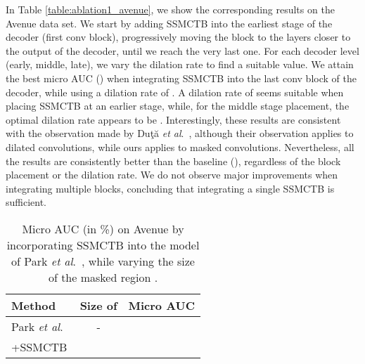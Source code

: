 \documentclass[10pt,journal,compsoc]{IEEEtran}
\newcommand{\etal}{\textit{et al}.}
\begin{document}
In Table \ref{table:ablation1_avenue}, we show the corresponding results on the Avenue data set. We start by adding SSMCTB into the earliest stage of the decoder (first conv block), progressively moving the block to the layers closer to the output of the decoder, until we reach the very last one. For each decoder level (early, middle, late), we vary the dilation rate to find a suitable value. We attain the best micro AUC () when integrating SSMCTB into the last conv block of the decoder, while using a dilation rate of . A dilation rate of  seems suitable when placing SSMCTB at an earlier stage, while, for the middle stage placement, the optimal dilation rate appears to be . Interestingly, these results are consistent with the observation made by Du\c{t}\u{a} \etal~\cite{Duta-ICCVW-2021}, although their observation applies to dilated convolutions, while ours applies to masked convolutions. Nevertheless, all the results are consistently better than the baseline (), regardless of the block placement or the dilation rate. We do not observe major improvements when integrating multiple blocks, concluding that integrating a single SSMCTB is sufficient.

\begin{table}[t!]
\centering 
\caption{Micro AUC (in \%) on Avenue by incorporating SSMCTB into the model of Park \etal~\cite{Park-CVPR-2020}, while varying the size of the masked region .}
\vspace{-0.2cm}
\setlength\tabcolsep{5.0pt}
\small
\begin{tabular}{| l | c | c |} 
\hline
 Method & Size of  & Micro AUC \\
 \hline \hline
 {Park \etal~\cite{Park-CVPR-2020}} 
 & - &  \\
\hline
 \multirow{3}{*}{+SSMCTB} &  &  \\
 &  &   \\
 &  &   \\

\hline
\end{tabular}
\vspace{-0.2cm}
\label{table:ablation2_avenue} \end{table}
\end{document}
